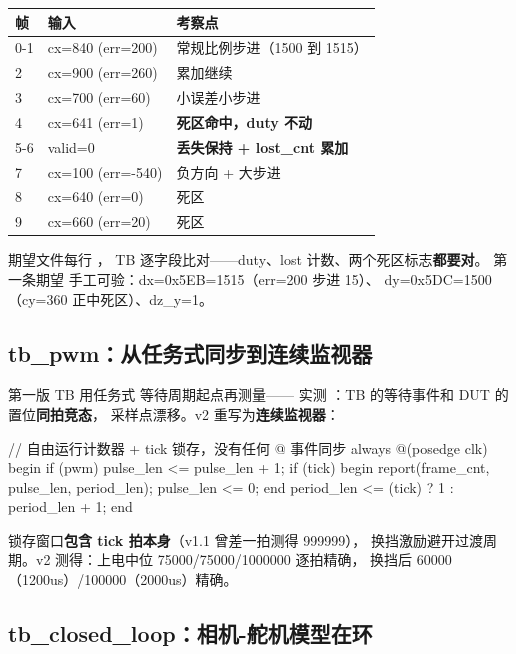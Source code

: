 \begin{center}
\begin{tabular}{lll}
\toprule
\rowcolor{rowtint}\textbf{帧} & \textbf{输入} & \textbf{考察点} \\
\midrule
0-1 & cx=840 (err=200) & 常规比例步进（1500 到 1515） \\
2   & cx=900 (err=260) & 累加继续 \\
3   & cx=700 (err=60)  & 小误差小步进 \\
4   & cx=641 (err=1)   & \textbf{死区命中，duty 不动} \\
5-6 & valid=0          & \textbf{丢失保持 + lost\_cnt 累加} \\
7   & cx=100 (err=-540) & 负方向 + 大步进 \\
8   & cx=640 (err=0)   & 死区 \\
9   & cx=660 (err=20)  & 死区 \\
\bottomrule
\end{tabular}
\end{center}

期望文件每行 ，
TB 逐字段比对——duty、lost 计数、两个死区标志\textbf{都要对}。
第一条期望  手工可验：dx=0x5EB=1515（err=200 步进 15）、
dy=0x5DC=1500（cy=360 正中死区）、dz\_y=1。

\subsection{tb\_pwm：从任务式同步到连续监视器}

第一版 TB 用任务式  等待周期起点再测量——
实测 ：TB 的等待事件和 DUT 的置位\textbf{同拍竞态}，
采样点漂移。v2 重写为\textbf{连续监视器}：

\begin{Verilog}
// 自由运行计数器 + tick 锁存，没有任何 @ 事件同步
always @(posedge clk) begin
    if (pwm) pulse_len <= pulse_len + 1;
    if (tick) begin
        report(frame_cnt, pulse_len, period_len);
        pulse_len <= 0;
    end
    period_len <= (tick) ? 1 : period_len + 1;
end
\end{Verilog}

锁存窗口\textbf{包含 tick 拍本身}（v1.1 曾差一拍测得 999999），
换挡激励避开过渡周期。v2 测得：上电中位 75000/75000/1000000 逐拍精确，
换挡后 60000（1200us）/100000（2000us）精确。

\subsection{tb\_closed\_loop：相机-舵机模型在环}

